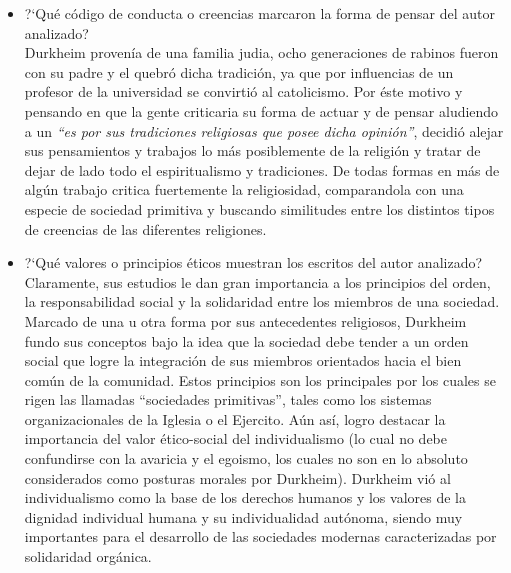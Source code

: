 \begin{itemize}
	\item ?`Qu\'e c\'odigo de conducta o creencias marcaron la forma de pensar del autor analizado?\\
	Durkheim proven\'ia de una familia judia, ocho generaciones de rabinos fueron con su padre y el quebr\'o dicha tradici\'on, ya que por influencias de un profesor de
	la universidad se convirtió al catolicismo. Por \'este motivo y pensando en que la gente criticaria su forma de actuar y de pensar aludiendo a un \emph{``es por sus
	tradiciones religiosas que posee dicha opini\'on''}, decidi\'o alejar sus pensamientos y trabajos lo m\'as posiblemente de la religi\'on y tratar de dejar de lado
	todo el espiritualismo y tradiciones. De todas formas en m\'as de alg\'un trabajo critica fuertemente la religiosidad, comparandola con una especie de sociedad primitiva y buscando similitudes entre los distintos tipos de creencias de las diferentes religiones.

	\item ?`Qu\'e valores o principios \'eticos muestran los escritos del autor analizado?\\
	Claramente, sus estudios le dan gran importancia a los principios del orden, la responsabilidad social y la solidaridad entre los miembros de una sociedad. Marcado de 
	una u otra forma por sus antecedentes religiosos, Durkheim fundo sus conceptos bajo la idea que la sociedad debe tender a un orden social que logre la integraci\'on de 
	sus miembros orientados hacia el bien com\'un de la comunidad. Estos principios son los principales por los cuales se rigen las llamadas ``sociedades primitivas'', tales 
	como los sistemas organizacionales de la Iglesia o el Ejercito. A\'un as\'i, logro destacar la importancia del valor \'etico-social del individualismo (lo cual no debe 
	confundirse con la avaricia y el egoismo, los cuales no son en lo absoluto considerados como posturas morales por Durkheim).
	Durkheim vi\'o al individualismo como la base de los derechos humanos y los valores de la dignidad individual humana y su individualidad aut\'onoma, siendo muy importantes 
	para el desarrollo de las sociedades modernas caracterizadas por solidaridad org\'anica.

\end{itemize}
\newpage
